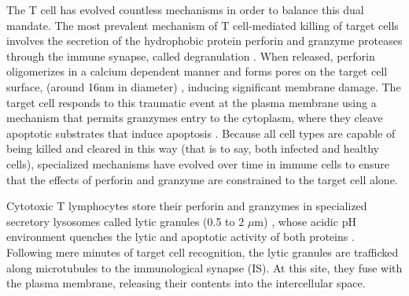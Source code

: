 The T cell has evolved countless mechanisms in order to balance this dual mandate. The most prevalent mechanism of T cell-mediated killing of target cells involves the secretion of the hydrophobic protein perforin and granzyme proteases through the immune synapse, called degranulation \cite{Dustin2010, Stinchcombe2007}. When released, perforin oligomerizes in a calcium dependent manner \cite{Law2010} and forms pores on the target cell surface, (around 16nm in diameter) \cite{Cartwright2014}, inducing significant membrane damage. The target cell responds to this traumatic event at the plasma membrane using a mechanism that permits granzymes entry to the cytoplasm, where they cleave apoptotic substrates that induce apoptosis \cite{Keefe2005}. Because all cell types are capable of being killed and cleared in this way (that is to say, both infected and healthy cells),  specialized mechanisms have evolved over time in immune cells to ensure that the effects of perforin and granzyme are constrained to the target cell alone.  

Cytotoxic T lymphocytes store their perforin and granzymes in specialized secretory lysosomes called lytic granules (0.5 to 2 $\mu$m) \cite{Sanchez-Ruiz2011}, whose acidic pH environment quenches the lytic and apoptotic activity of both proteins \cite{Thiery2014, Keefe2005}. Following mere minutes of target cell recognition, the lytic granules are trafficked along microtubules to the immunological synapse (IS). At this site, they fuse with the plasma membrane, releasing their contents into the intercellular space.

